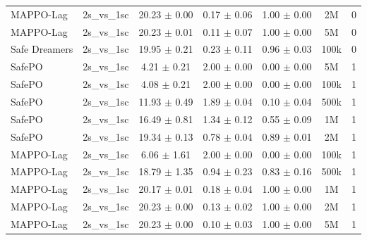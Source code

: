 \begin{longtable}{lcccccc}
MAPPO-Lag & 2s\_vs\_1sc & \textcolor{red!70!black}{20.23 $\pm$ 0.00} & \textcolor{red!70!black}{0.17 $\pm$ 0.06} & \textcolor{red!70!black}{1.00 $\pm$ 0.00} & 2M & 0 \\
MAPPO-Lag & 2s\_vs\_1sc & \textcolor{red!70!black}{20.23 $\pm$ 0.01} & \textcolor{red!70!black}{0.11 $\pm$ 0.07} & \textcolor{red!70!black}{1.00 $\pm$ 0.00} & 5M & 0 \\
Safe Dreamers & 2s\_vs\_1sc & 19.95 $\pm$ 0.21 & 0.23 $\pm$ 0.11 & 0.96 $\pm$ 0.03 & 100k & 0 \\
\midrule
SafePO & 2s\_vs\_1sc & \textcolor{green!60!black}{4.21 $\pm$ 0.21} & \textcolor{green!60!black}{2.00 $\pm$ 0.00} & \textcolor{green!60!black}{0.00 $\pm$ 0.00} & 5M & 1 \\
SafePO & 2s\_vs\_1sc & \textcolor{green!60!black}{4.08 $\pm$ 0.21} & \textcolor{green!60!black}{2.00 $\pm$ 0.00} & \textcolor{green!60!black}{0.00 $\pm$ 0.00} & 100k & 1 \\
SafePO & 2s\_vs\_1sc & \textcolor{green!60!black}{11.93 $\pm$ 0.49} & \textcolor{green!60!black}{1.89 $\pm$ 0.04} & \textcolor{green!60!black}{0.10 $\pm$ 0.04} & 500k & 1 \\
SafePO & 2s\_vs\_1sc & \textcolor{green!60!black}{16.49 $\pm$ 0.81} & \textcolor{green!60!black}{1.34 $\pm$ 0.12} & \textcolor{green!60!black}{0.55 $\pm$ 0.09} & 1M & 1 \\
SafePO & 2s\_vs\_1sc & \textcolor{green!60!black}{19.34 $\pm$ 0.13} & \textcolor{green!60!black}{0.78 $\pm$ 0.04} & \textcolor{green!60!black}{0.89 $\pm$ 0.01} & 2M & 1 \\
MAPPO-Lag & 2s\_vs\_1sc & \textcolor{green!60!black}{6.06 $\pm$ 1.61} & \textcolor{green!60!black}{2.00 $\pm$ 0.00} & \textcolor{green!60!black}{0.00 $\pm$ 0.00} & 100k & 1 \\
MAPPO-Lag & 2s\_vs\_1sc & \textcolor{green!60!black}{18.79 $\pm$ 1.35} & \textcolor{green!60!black}{0.94 $\pm$ 0.23} & \textcolor{green!60!black}{0.83 $\pm$ 0.16} & 500k & 1 \\
MAPPO-Lag & 2s\_vs\_1sc & \textcolor{red!70!black}{20.17 $\pm$ 0.01} & \textcolor{red!70!black}{0.18 $\pm$ 0.04} & \textcolor{red!70!black}{1.00 $\pm$ 0.00} & 1M & 1 \\
MAPPO-Lag & 2s\_vs\_1sc & \textcolor{red!70!black}{20.23 $\pm$ 0.00} & \textcolor{red!70!black}{0.13 $\pm$ 0.02} & \textcolor{red!70!black}{1.00 $\pm$ 0.00} & 2M & 1 \\
MAPPO-Lag & 2s\_vs\_1sc & \textcolor{red!70!black}{20.23 $\pm$ 0.00} & \textcolor{red!70!black}{0.10 $\pm$ 0.03} & \textcolor{red!70!black}{1.00 $\pm$ 0.00} & 5M & 1 \\

\end{longtable}

